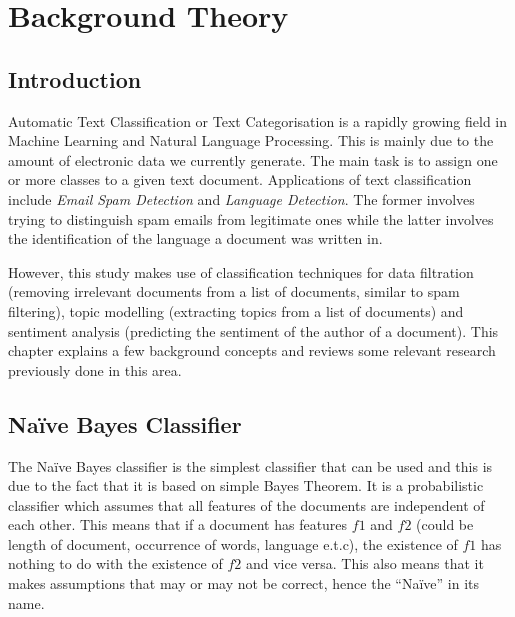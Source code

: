 
\chapter{Background Theory}

\label{ch:background}

\section{Introduction}
\label{sec:background_introduction}

Automatic Text Classification or Text Categorisation is a rapidly growing field in Machine Learning
and Natural Language Processing. This is mainly due to the amount of electronic data we currently
generate. The main task is to assign one or more classes to a given text document. Applications of
text classification include \textit{Email Spam Detection} and \textit{Language
Detection}. The former involves trying to distinguish spam emails from legitimate ones while the
latter involves the identification of the language a document was written in.

However, this study makes use of classification techniques for data filtration (removing irrelevant
documents from a list of documents, similar to spam filtering), topic modelling (extracting topics
from a list of documents) and sentiment analysis (predicting the sentiment of the author of a
document). This chapter explains a few background concepts and reviews some relevant research
previously done in this area.

\section{Na\"{i}ve Bayes Classifier}
\label{sec:bg_naive_bayes}
The Na\"{i}ve Bayes classifier is the simplest classifier that can be used and this is due to the
fact that it is based on simple Bayes Theorem. It is a probabilistic classifier which assumes that
all features of the documents are independent of each other. This means that if a document has
features $f1$ and $f2$ (could be length of document, occurrence of words, language e.t.c), the
existence of $f1$ has nothing to do with the existence of $f2$ and vice versa. This also means that
it makes assumptions that may or may not be correct, hence the ``Na\"{i}ve'' in its name.

